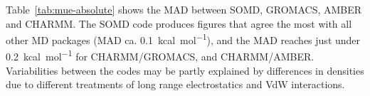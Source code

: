 \documentclass[journal=jctcce,manuscript=article]{achemso}
\begin{document}

Table~\ref{tab:mue-absolute} shows the MAD between SOMD, GROMACS, AMBER and 
CHARMM. The SOMD code produces figures that agree the most with all other MD packages (MAD ca.  \SI{0.1}{kcal.mol^{-1}}), and the MAD reaches just under 
\SI{0.2}{kcal.mol^{-1}} for CHARMM/GROMACS, and CHARMM/AMBER. Variabilities between the codes may be partly explained by differences in densities due to different treatments of long range electrostatics and VdW interactions. 
\end{document}
